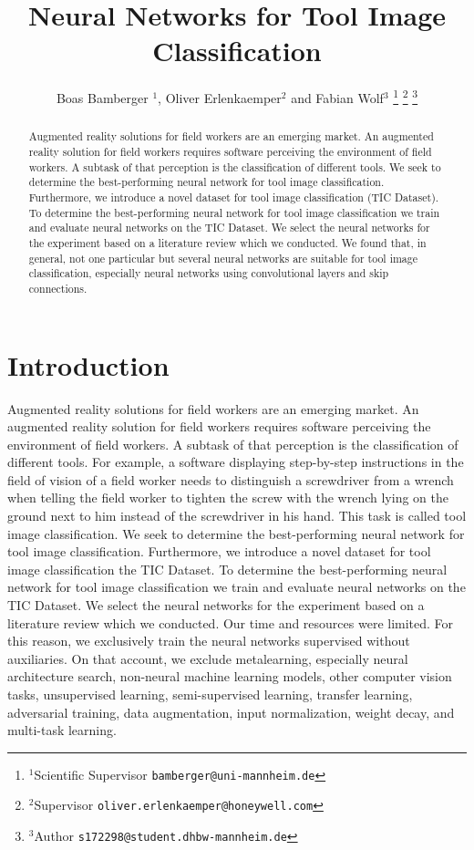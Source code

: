 \documentclass[a4paper, 10pt, journal]{wissarbIEEE}
\title{\LARGE \bf Neural Networks for Tool Image Classification}
\author{Boas Bamberger $^{1}$, Oliver Erlenkaemper$^{2}$ and Fabian Wolf$^{3}$ 
\thanks{$^{1}$Scientific Supervisor {\tt\small bamberger@uni-mannheim.de}} \thanks{$^{2}$Supervisor {\tt\small oliver.erlenkaemper@honeywell.com}} \thanks{$^{3}$Author {\tt\small s172298@student.dhbw-mannheim.de}}
}
\begin{document}
\maketitle
\begin{abstract}
Augmented reality solutions for field workers are an emerging market. \cite{Guy.2019} An augmented reality solution for field workers requires software perceiving the environment of field workers. A subtask of that perception is the classification of different tools.
We seek to determine the best-performing neural network for tool image classification.
Furthermore, we introduce a novel dataset for tool image classification (TIC Dataset). To determine the best-performing neural network for tool image classification we train and evaluate neural networks on the TIC Dataset. We select the neural networks for the experiment based on a literature review which we conducted.
We found that, in general, not one particular but several neural networks are suitable for tool image classification, especially neural networks using convolutional layers and skip connections.
\end{abstract}

\section{Introduction}
\label{sec:intro}
Augmented reality solutions for field workers are an emerging market. \cite{Guy.2019} An augmented reality solution for field workers requires software perceiving the environment of field workers. A subtask of that perception is the classification of different tools. For example, a software displaying step-by-step instructions in the field of vision of a field worker needs to distinguish a screwdriver from a wrench when telling the field worker to tighten the screw with the wrench lying on the ground next to him instead of the screwdriver in his hand. This task is called tool image classification. We seek to determine the best-performing neural network for tool image classification. Furthermore, we introduce a novel dataset for tool image classification the TIC Dataset. To determine the best-performing neural network for tool image classification we train and evaluate neural networks on the TIC Dataset. We select the neural networks for the experiment based on a literature review which we conducted. Our time and resources were limited. For this reason, we exclusively train the neural networks supervised without auxiliaries. On that account, we exclude metalearning, especially neural architecture search, non-neural machine learning models, other computer vision tasks, unsupervised learning, semi-supervised learning, transfer learning, adversarial training, data augmentation, input normalization, weight decay, and multi-task learning.
\end{document}
